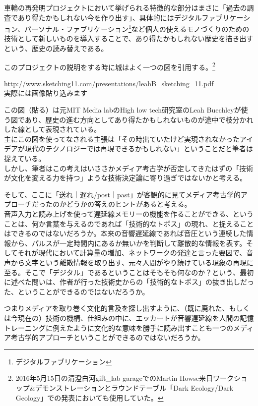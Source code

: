\documentclass[a4paper,report]{jsbook}
\begin{document}
車輪の再発明プロジェクトにおいて挙げられる特徴的な部分はまさに「過去の調査であり得たかもしれない今を作り出す」、具体的にはデジタルファブリケーション、パーソナル・ファブリケーション\footnote{デジタルファブリケーション}など個人の使えるモノづくりのための技術として新しいものを導入することで、あり得たかもしれない歴史を描き出すという、歴史の読み替えである。

このプロジェクトの説明をする時に城はよく一つの図を引用する。\footnote{2016年5月15日の清澄白河gift\_lab
  garageでのMartin
  Howse来日ワークショップ\&デモンストレーションとラウンドテーブル「Dark
  Ecology/Dark Geology」での発表においても使用していた。}\\
\autocite{soundstudies3}

http://www.sketching11.com/presentations/leahB\_sketching\_11.pdf\\
実際には画像貼り込みます

この図（貼る）は元MIT Media labのHigh low tech研究室のLeah
Buechleyが使う図であり、歴史の進む方向としてあり得たかもしれないものが途中で枝分かれした線として表現されている。\\
主にこの図を使ってなされる主張は「その時出ていたけど実現されなかったアイデアが現代のテクノロジーでは再現できるかもしれない」ということだと筆者は捉えている。\\
しかし、筆者はこの考えはいささかメディア考古学が否定してきたはずの「技術が文化を変える力を持つ」ような技術決定論に寄り過ぎではないかと考える。

そして、ここに「送れ｜遅れ/post｜past」が客観的に見てメディア考古学的アプローチだったのかどうかの答えのヒントがあると考える。\\
音声入力と読み上げを使って遅延線メモリーの機能を作ることができる、ということは、何か言葉を与えるのであれば「技術的なトポス」の現れ、と捉えることはできるのではないだろうか。本来の音響遅延線であれば音圧という連続した情報から、パルスが一定時間内にあるか無いかを判断して離散的な情報を表す。そしてそれが現代において計算量の増加、ネットワークの発達と言った要因で、音声から文字という離散情報を取り出す、元々人間がやり続けている現象の再現に至る。そこで「デジタル」であるということはそもそも何なのか？という、最初に述べた問いは、作者が行った技術史からの「技術的なトポス」の抜き出しだった、ということができるのではないだろうか。

つまりメディアを取り巻く文化的言及を探し出すように、（既に廃れた、もしくは今現在の）技術の機構、仕組みの中に、エッカートが音響遅延線を人間の記憶トレーニングに例えたように文化的な意味を勝手に読み出すことも一つのメディア考古学的アプローチということができるのではないだろうか。
\end{document}
